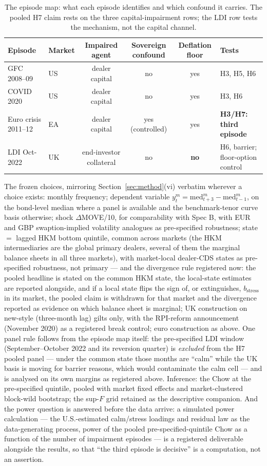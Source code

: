 \documentclass[11pt]{article}
\begin{document}
\begin{table}[h!]
\centering\small
\begin{tabular}{llcccl}
\toprule
Episode & Market & Impaired agent & Sovereign confound & Deflation floor & Tests \\
\midrule
GFC 2008--09 & US & dealer capital & no & yes & H3, H5, H6 \\
COVID 2020 & US & dealer capital & no & yes & H3, H6 \\
Euro crisis 2011--12 & EA & dealer capital & yes (controlled) & yes & \textbf{H3/H7: third episode} \\
LDI Oct-2022 & UK & end-investor collateral & no & \textbf{no} & H6, barrier; floor-option control \\
\bottomrule
\end{tabular}
\caption{The episode map: what each episode identifies and which confound it carries. The pooled H7 claim rests on the three capital-impairment rows; the LDI row tests the mechanism, not the capital channel.}
\end{table}

The frozen choices, mirroring Section~\ref{sec:method}(vi) verbatim wherever a choice exists: monthly frequency; dependent variable $y^m_t=\text{med}^m_{t+3}-\text{med}^m_{t-1}$, on the bond-level median where a panel is available and the benchmark-tenor curve basis otherwise; shock $\Delta$MOVE/10, for comparability with Spec B, with EUR and GBP swaption-implied volatility analogues as pre-specified robustness; state $=$ lagged HKM bottom quintile, common across markets (the HKM intermediaries are the global primary dealers, several of them the marginal balance sheets in all three markets), with market-local dealer-CDS states as pre-specified robustness, not primary --- and the divergence rule registered now: the pooled headline is stated on the common HKM state, the local-state estimates are reported alongside, and if a local state flips the sign of, or extinguishes, $b_{\text{stress}}$ in its market, the pooled claim is withdrawn for that market and the divergence reported as evidence on which balance sheet is marginal; UK construction on new-style (three-month lag) gilts only, with the RPI-reform announcement (November 2020) as a registered break control; euro construction as above. One panel rule follows from the episode map itself: the pre-specified LDI window (September--October 2022 and its reversion quarter) is \emph{excluded} from the H7 pooled panel --- under the common state those months are ``calm'' while the UK basis is moving for barrier reasons, which would contaminate the calm cell --- and is analysed on its own margins as registered above. Inference: the Chow at the pre-specified quintile, pooled with market fixed effects and market-clustered block-wild bootstrap; the sup-$F$ grid retained as the descriptive companion. And the power question is answered before the data arrive: a simulated power calculation --- the U.S.-estimated calm/stress loadings and residual law as the data-generating process, power of the pooled pre-specified-quintile Chow as a function of the number of impairment episodes --- is a registered deliverable alongside the results, so that ``the third episode is decisive'' is a computation, not an assertion.
\end{document}
